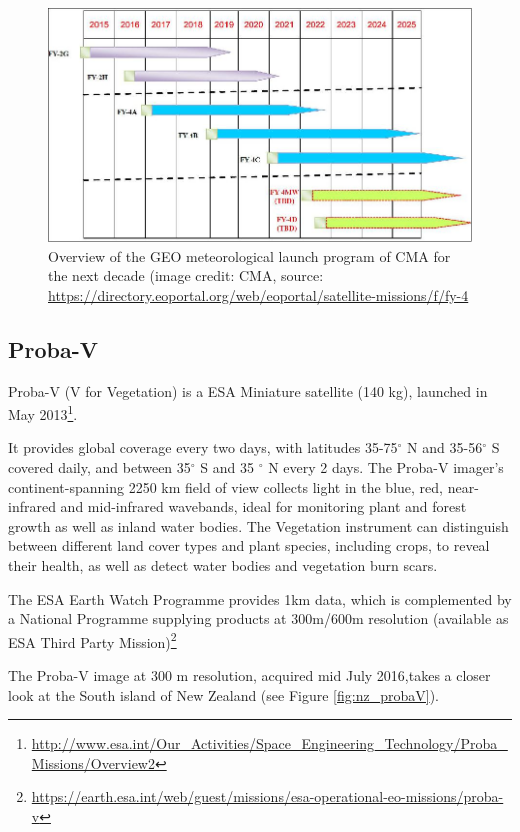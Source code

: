 \documentclass{article}
\def\deg{$^\circ$\xspace}
\begin{document}
\begin{figure}[h!]    
\centering
\includegraphics[width=\linewidth]{figures/FY4_Auto4.jpeg}
\caption{Overview of the GEO meteorological launch program of CMA for the next decade (image credit: CMA, source: \url{https://directory.eoportal.org/web/eoportal/satellite-missions/f/fy-4}}
\label{fig:fy4}
\end{figure}




\subsection{Proba-V}
\label{probaV}
Proba-V (V for Vegetation) is a ESA Miniature satellite (140 kg), launched in May 2013\footnote{\url{http://www.esa.int/Our_Activities/Space_Engineering_Technology/Proba_Missions/Overview2}}. 

It provides global coverage every two days, with latitudes 35-75\deg N and 35-56\deg S covered daily, and between 35\deg S and 35 \deg N  every 2 days. 
The Proba-V imager's continent-spanning 2250 km field of view collects light in the blue, red, near-infrared and mid-infrared wavebands, ideal for monitoring plant and forest growth as well as inland water bodies. The Vegetation instrument can distinguish between different land cover types and plant species, including crops, to reveal their health, as well as detect water bodies and vegetation burn scars.

The ESA Earth Watch Programme provides 1km data, which is complemented by a National Programme supplying products at 300m/600m resolution (available as ESA Third Party Mission)\footnote{\url{https://earth.esa.int/web/guest/missions/esa-operational-eo-missions/proba-v}}

The Proba-V image at 300 m resolution, acquired mid July 2016,takes a closer look at the South island of New Zealand (see Figure \ref{fig:nz_probaV}).
\end{document}

